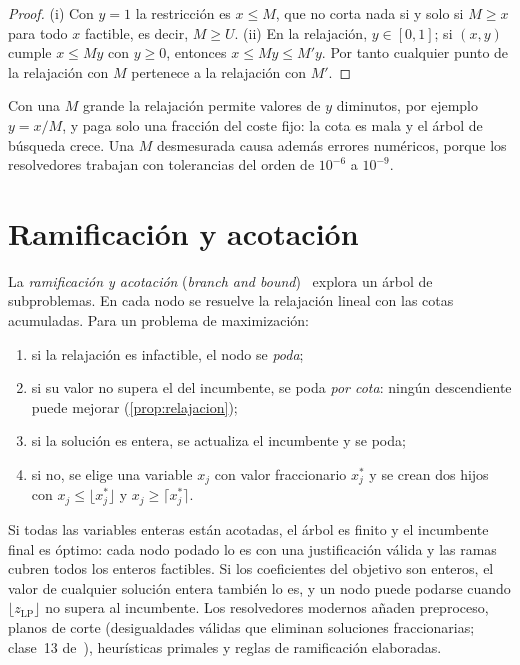 \begin{proof}
(i) Con $y=1$ la restricción es $x\le M$, que no corta nada si y solo si $M\ge x$ para todo $x$ factible, es decir, $M\ge U$. (ii) En la relajación, $y\in[0,1]$; si $(x,y)$ cumple $x\le My$ con $y\ge 0$, entonces $x\le My\le M'y$. Por tanto cualquier punto de la relajación con $M$ pertenece a la relajación con $M'$.
\end{proof}

Con una $M$ grande la relajación permite valores de $y$ diminutos, por ejemplo $y=x/M$, y paga solo una fracción del coste fijo: la cota es mala y el árbol de búsqueda crece. Una $M$ desmesurada causa además errores numéricos, porque los resolvedores trabajan con tolerancias del orden de $10^{-6}$ a $10^{-9}$.

\section{Ramificación y acotación}

La \emph{ramificación y acotación} (\emph{branch and bound})~\cite{landdoig} explora un árbol de subproblemas. En cada nodo se resuelve la relajación lineal con las cotas acumuladas. Para un problema de maximización:
\begin{enumerate}[label=\arabic*.]
  \item si la relajación es infactible, el nodo se \emph{poda};
  \item si su valor no supera el del incumbente, se poda \emph{por cota}: ningún descendiente puede mejorar (\cref{prop:relajacion});
  \item si la solución es entera, se actualiza el incumbente y se poda;
  \item si no, se elige una variable $x_j$ con valor fraccionario $x_j^{*}$ y se crean dos hijos con $x_j\le\lfloor x_j^{*}\rfloor$ y $x_j\ge\lceil x_j^{*}\rceil$.
\end{enumerate}
Si todas las variables enteras están acotadas, el árbol es finito y el incumbente final es óptimo: cada nodo podado lo es con una justificación válida y las ramas cubren todos los enteros factibles. Si los coeficientes del objetivo son enteros, el valor de cualquier solución entera también lo es, y un nodo puede podarse cuando $\lfloor z_{\mathrm{LP}}\rfloor$ no supera al incumbente. Los resolvedores modernos añaden preproceso, planos de corte (desigualdades válidas que eliminan soluciones fraccionarias; clase~13 de~\cite{mit15053}), heurísticas primales y reglas de ramificación elaboradas.

